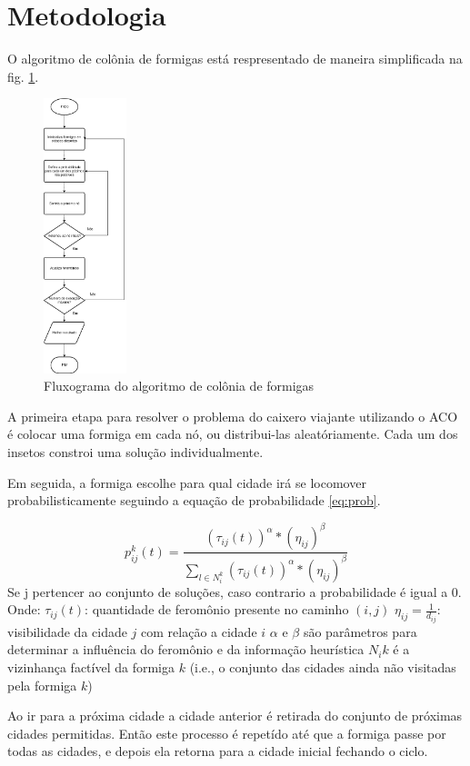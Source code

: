 \documentclass[11pt]{article}
\begin{document}
\section{Metodologia}
\label{sec:desen}

O algoritmo de colônia de formigas está respresentado de maneira simplificada na fig. \ref{fig:flux}.

\begin{figure}
  \centering
  \includegraphics[height=8cm]{formigas.png}
  \caption{Fluxograma do algoritmo de colônia de formigas}
  \label{fig:flux}
\end{figure}

A primeira etapa para resolver o problema do caixero viajante utilizando o ACO é
colocar uma formiga em cada nó, ou distribui-las aleatóriamente. Cada um dos insetos
constroi uma solução individualmente.

Em seguida, a formiga escolhe para qual cidade irá se locomover probabilisticamente
seguindo a equação de probabilidade \ref{eq:prob}.

\begin{equation}\label{eq:prob}
  p_{ij}^{k}(t)=
    \frac{(\tau_{ij}(t))^\alpha * (\eta_{ij})^\beta}{\sum_{l\in N_{i}^{k}}{(\tau_{ij}(t))^\alpha * (\eta_{ij})^\beta}}
\end{equation}
Se j pertencer ao conjunto de soluções, caso contrario a probabilidade é igual a 0.
Onde:
$\tau_{ij}(t)$: quantidade de feromônio presente no caminho $(i,j)$
$\eta_{ij} = \frac{1}{d_{ij}}$: visibilidade da cidade $j$ com relação a cidade $i$
$\alpha$ e $\beta$ são parâmetros para determinar a influência do feromônio e da informação
heurística
$N_{i}{k}$ é a vizinhança factível da formiga $k$ (i.e., o conjunto
das cidades ainda não visitadas pela formiga $k$)

Ao ir para a próxima cidade a cidade anterior é retirada do conjunto de próximas
cidades permitidas. Então este processo é repetído até que a formiga passe por todas
as cidades, e depois ela retorna para a cidade inicial fechando o ciclo.



\nocite{*}


\end{document}
